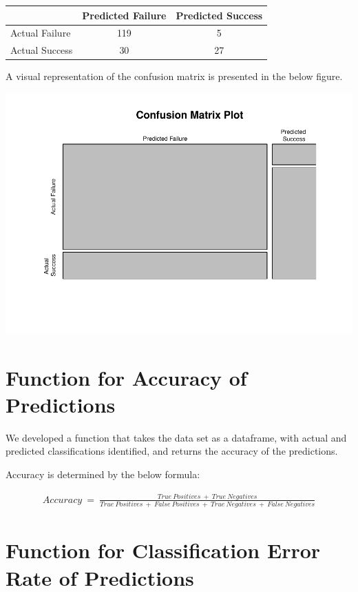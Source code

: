 \documentclass[]{article}
\begin{document}
\begin{longtable}[c]{@{}lcc@{}}
\toprule
& Predicted Failure & Predicted Success\tabularnewline
\midrule
\endhead
Actual Failure & 119 & 5\tabularnewline
Actual Success & 30 & 27\tabularnewline
\bottomrule
\end{longtable}

A visual representation of the confusion matrix is presented in the
below figure.

\begin{center}\includegraphics{Homework_2_files/figure-latex/unnamed-chunk-3-1} \end{center}

\section{Function for Accuracy of
Predictions}\label{function-for-accuracy-of-predictions}

We developed a function that takes the data set as a dataframe, with
actual and predicted classifications identified, and returns the
accuracy of the predictions.

Accuracy is determined by the below formula:

\[
\begin{aligned}
Accuracy~=~\frac{True~Positives~+~True~Negatives}{True~Positives~+~False~Positives~+~True~Negatives~+~False~Negatives}\end{aligned}
\]

\section{Function for Classification Error Rate of
Predictions}\label{function-for-classification-error-rate-of-predictions}
\end{document}
